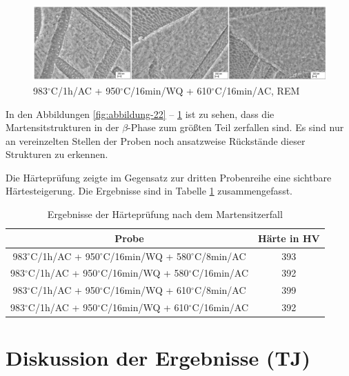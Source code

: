 \begin{figure}
	\centering
	\includegraphics[width=1.0\linewidth]{./Bilder/Abbildung 25.png}
	\caption[Abbildung 25]{983$^\circ$C/1h/AC + 950$^\circ$C/16min/WQ + 610$^\circ$C/16min/AC, REM}
	\label{fig:abbildung-25}
\end{figure}

In den Abbildungen \ref{fig:abbildung-22} -- \ref{fig:abbildung-25} ist zu sehen, dass die Martensitstrukturen in der $\beta$-Phase zum größten Teil zerfallen sind. Es sind nur an vereinzelten Stellen der Proben noch ansatzweise Rückstände dieser Strukturen zu erkennen.

Die Härteprüfung zeigte im Gegensatz zur dritten Probenreihe eine sichtbare Härtesteigerung. Die Ergebnisse sind in Tabelle \ref{Tabelle 8} zusammengefasst.

\begin{table}
	\centering
	\begin{tabular}{|c|c|}
		\hline 
		Probe & Härte in HV \\ 
		\hline 
		983$^\circ$C/1h/AC + 950$^\circ$C/16min/WQ + 580$^\circ$C/8min/AC & 393 \\ 
		\hline 
		983$^\circ$C/1h/AC + 950$^\circ$C/16min/WQ + 580$^\circ$C/16min/AC & 392 \\ 
		\hline 
		983$^\circ$C/1h/AC + 950$^\circ$C/16min/WQ + 610$^\circ$C/8min/AC & 399 \\ 
		\hline 
		983$^\circ$C/1h/AC + 950$^\circ$C/16min/WQ + 610$^\circ$C/16min/AC & 392 \\ 
		\hline 
	\end{tabular} 
	\caption{Ergebnisse der Härteprüfung nach dem Martensitzerfall}
	\label{Tabelle 8}
\end{table}

\section{Diskussion der Ergebnisse (TJ)}

